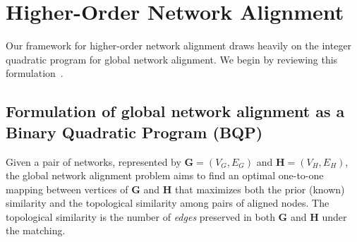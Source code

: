 \documentclass[10pt, journal, compsoc, final]{IEEEtran}
\newcommand{\bs}[1]{\boldsymbol{#1}}
\newcommand{\Graph}[1]{\mathit{\mathbf{\bs{#1}}}}
\newcommand{\Set}[1]{\mathit{#1}}
\begin{document}
\section{Higher-Order Network Alignment}

Our framework for higher-order network alignment draws heavily on the integer quadratic program
for global network alignment. We begin by reviewing this formulation~\cite{BP,Natalie1,Natalie2}.

\subsection{Formulation of global network alignment as a Binary Quadratic Program (BQP)}
\label{sec:GNAnotations}

Given a pair of networks, represented by $\Graph{G}=(\Set{V}_G, \Set{E}_G)$ and
$\Graph{H}=(\Set{V}_H, \Set{E}_H)$,
the global network alignment problem aims to find an optimal one-to-one mapping between vertices of
$\Graph{G}$ and $\Graph{H}$ that maximizes both the prior (known) similarity and the topological similarity among pairs of aligned nodes.  The topological similarity is the number of \emph{edges} preserved in both $\Graph{G}$ and $\Graph{H}$ under the matching. 
\end{document}
